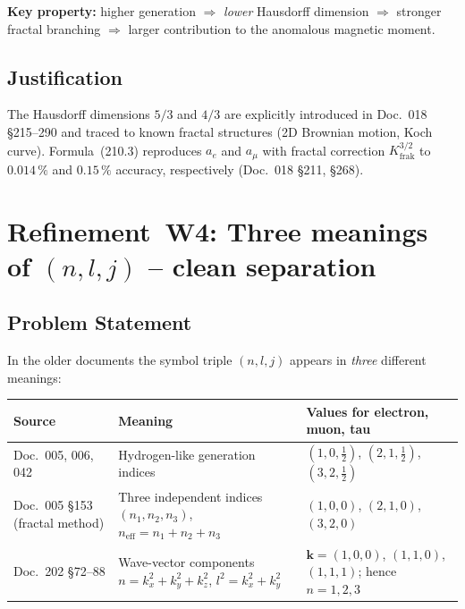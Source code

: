 \textbf{Key property:} higher generation $\Rightarrow$ \emph{lower}
Hausdorff dimension $\Rightarrow$ stronger fractal branching
$\Rightarrow$ larger contribution to the anomalous magnetic moment.

\subsection*{Justification}

The Hausdorff dimensions $5/3$ and $4/3$ are explicitly introduced in
Doc.~018 §215--290 and traced to known fractal structures (2D Brownian
motion, Koch curve). Formula~(210.3) reproduces $a_e$ and $a_\mu$ with
fractal correction $K_{\text{frak}}^{3/2}$ to $0.014\,\%$ and
$0.15\,\%$ accuracy, respectively (Doc.~018 §211, §268).

\section{\texorpdfstring{Refinement~W4: Three meanings of $(n,l,j)$ -- clean separation}{Refinement W4: Three meanings of (n,l,j)}}

\subsection*{Problem Statement}

In the older documents the symbol triple $(n,l,j)$ appears in
\emph{three} different meanings:

\begin{center}
\renewcommand{\arraystretch}{1.4}
{\footnotesize
\begin{tabular}{>{\raggedright\arraybackslash}p{3.4cm}>{\raggedright\arraybackslash}p{4.5cm}>{\raggedright\arraybackslash}p{4.8cm}}
\toprule
\textbf{Source} & \textbf{Meaning} & \textbf{Values for electron, muon, tau} \\
\midrule
Doc.~005, 006, 042 &
  Hydrogen-like generation indices &
  $(1,0,\tfrac12)$, $(2,1,\tfrac12)$, $(3,2,\tfrac12)$ \\
Doc.~005 §153 (fractal method) &
  Three independent indices $(n_1, n_2, n_3)$, $n_{\text{eff}} = n_1+n_2+n_3$ &
  $(1,0,0)$, $(2,1,0)$, $(3,2,0)$ \\
Doc.~202 §72--88 &
  Wave-vector components $n = k_x^2 + k_y^2 + k_z^2$, $l^2 = k_x^2 + k_y^2$ &
  $\mathbf{k} = (1,0,0)$, $(1,1,0)$, $(1,1,1)$; hence $n = 1, 2, 3$ \\
\bottomrule
\end{tabular}
}
\renewcommand{\arraystretch}{1.0}
\end{center}

